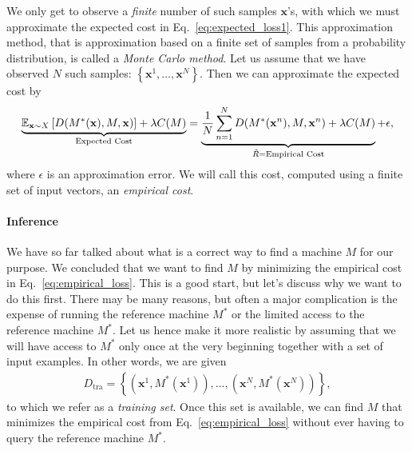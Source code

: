 \documentclass{report}
\newcommand{\vect}[1]{\mathbf{#1}}
\newcommand{\vx}[0]{\vect{x}}
\begin{document}
We only get to observe a {\it finite} number of such samples $\vx$'s, with which
we must approximate the expected cost in Eq.~\eqref{eq:expected_loss1}. This
approximation method, that is approximation based on a finite set of samples
from a probability distribution, is called a {\it Monte Carlo method}.  Let us
assume that we have observed $N$ such samples: $\left\{ \vx^1, \ldots, \vx^N
\right\}$. Then we can approximate the expected cost by
\begin{align}
    \label{eq:empirical_loss}
    \underbrace{\mathbb{E}_{\vx \sim X} \left[ D(M^*(\vx), M, \vx) \right] +
    \lambda C(M)}_{
        \mathclap{\text{Expected Cost}}
    } =
    \underbrace{
        \frac{1}{N} \sum_{n=1}^N D(M^*(\vx^n), M, \vx^n)
        + \lambda C(M)
    }_{\mathclap{\tilde{R} = \text{Empirical Cost}}} + \epsilon,
\end{align}
where $\epsilon$ is an approximation error. We will call this cost, computed
using a finite set of input vectors, an {\it empirical cost}. 

\paragraph{Inference}

We have so far talked about what is a correct way to find a machine $M$ for our
purpose. We concluded that we want to find $M$ by minimizing the empirical cost
in Eq.~\eqref{eq:empirical_loss}. This is a good start, but let's discuss why we
want to do this first. There may be many reasons, but often a major complication
is the expense of running the reference machine $M^*$ or the limited access to
the reference machine $M^*$. Let us hence make it more realistic by assuming
that we will have access to $M^*$ only once at the very beginning together with
a set of input examples. In other words, we are given
\begin{align*}
    D_{\text{tra}} = \left\{ (\vx^1, M^*(\vx^1)), \ldots, (\vx^N,
    M^*(\vx^N))\right\},
\end{align*}
to which we refer as a {\it training set}. Once this set is available, we can
find $M$ that minimizes the empirical cost from Eq.~\eqref{eq:empirical_loss}
without ever having to query the reference machine $M^*$. 
\end{document}
